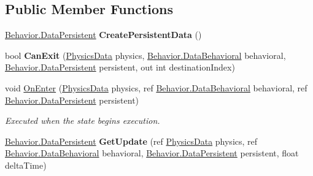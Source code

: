 \subsection*{Public Member Functions}
\begin{DoxyCompactItemize}
\item 
\hypertarget{class_skyrates_1_1_a_i_1_1_state_1_1_state_a2f1f04f9cbe51e2e06d0de6a38d702a2}{\hyperlink{class_skyrates_1_1_a_i_1_1_behavior_1_1_data_persistent}{Behavior.\-Data\-Persistent} {\bfseries Create\-Persistent\-Data} ()}\label{class_skyrates_1_1_a_i_1_1_state_1_1_state_a2f1f04f9cbe51e2e06d0de6a38d702a2}

\item 
\hypertarget{class_skyrates_1_1_a_i_1_1_state_1_1_state_a187dcd3a030f0e1462bd00ca4b6a81a3}{bool {\bfseries Can\-Exit} (\hyperlink{class_skyrates_1_1_physics_1_1_physics_data}{Physics\-Data} physics, \hyperlink{class_skyrates_1_1_a_i_1_1_behavior_1_1_data_behavioral}{Behavior.\-Data\-Behavioral} behavioral, \hyperlink{class_skyrates_1_1_a_i_1_1_behavior_1_1_data_persistent}{Behavior.\-Data\-Persistent} persistent, out int destination\-Index)}\label{class_skyrates_1_1_a_i_1_1_state_1_1_state_a187dcd3a030f0e1462bd00ca4b6a81a3}

\item 
void \hyperlink{class_skyrates_1_1_a_i_1_1_state_1_1_state_a46daed16dabac5ed893958a47906b45d}{On\-Enter} (\hyperlink{class_skyrates_1_1_physics_1_1_physics_data}{Physics\-Data} physics, ref \hyperlink{class_skyrates_1_1_a_i_1_1_behavior_1_1_data_behavioral}{Behavior.\-Data\-Behavioral} behavioral, ref \hyperlink{class_skyrates_1_1_a_i_1_1_behavior_1_1_data_persistent}{Behavior.\-Data\-Persistent} persistent)
\begin{DoxyCompactList}\small\item\em Executed when the state begins execution. \end{DoxyCompactList}\item 
\hypertarget{class_skyrates_1_1_a_i_1_1_state_1_1_state_ab47704b5a44e02ff9daba4b6e4e2c88c}{\hyperlink{class_skyrates_1_1_a_i_1_1_behavior_1_1_data_persistent}{Behavior.\-Data\-Persistent} {\bfseries Get\-Update} (ref \hyperlink{class_skyrates_1_1_physics_1_1_physics_data}{Physics\-Data} physics, ref \hyperlink{class_skyrates_1_1_a_i_1_1_behavior_1_1_data_behavioral}{Behavior.\-Data\-Behavioral} behavioral, \hyperlink{class_skyrates_1_1_a_i_1_1_behavior_1_1_data_persistent}{Behavior.\-Data\-Persistent} persistent, float delta\-Time)}\label{class_skyrates_1_1_a_i_1_1_state_1_1_state_ab47704b5a44e02ff9daba4b6e4e2c88c}


\end{DoxyCompactItemize}
